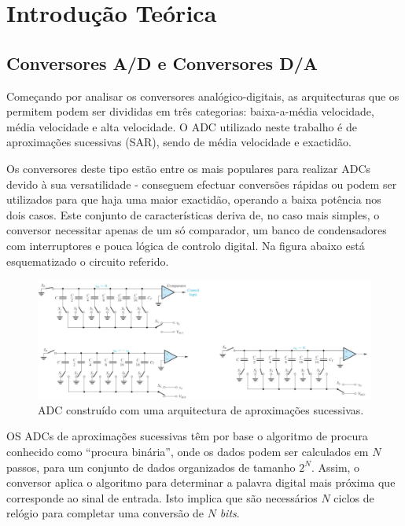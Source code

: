 \documentclass[11pt]{article}
\numberwithin{equation}{section}
\begin{document}
\section{Introdução Teórica}
\subsection{Conversores A/D e Conversores D/A}

Começando por analisar os conversores analógico-digitais, as arquitecturas que os permitem podem ser divididas em três categorias: baixa-a-média velocidade, média velocidade e alta velocidade. O ADC utilizado neste trabalho é de aproximações sucessivas (SAR), sendo de média velocidade e exactidão. 

Os conversores deste tipo estão entre os mais populares para realizar ADCs devido à sua versatilidade - conseguem efectuar conversões rápidas ou podem ser utilizados para que haja uma maior exactidão, operando a baixa potência nos dois casos. Este conjunto de características deriva de, no caso mais simples, o conversor necessitar apenas de um só comparador, um banco de condensadores com interruptores e pouca lógica de controlo digital. Na figura abaixo está esquematizado o circuito referido.

\begin{figure}[h]
	\centering
	\includegraphics[keepaspectratio=true, scale=0.45]{./teoricas/SAR_1}
	\caption{ADC construído com uma arquitectura de aproximações sucessivas.}
	\vspace{-0.8em}
\end{figure}

OS ADCs de aproximações sucessivas têm por base o algoritmo de procura conhecido como ``procura binária'', onde os dados podem ser calculados em $N$ passos, para um conjunto de dados organizados de tamanho $2^N$. Assim, o conversor aplica o algoritmo para determinar a palavra digital mais próxima que corresponde ao sinal de entrada. Isto implica que são necessários $N$ ciclos de relógio para completar uma conversão de $N$ \textit{bits}.
\end{document}
